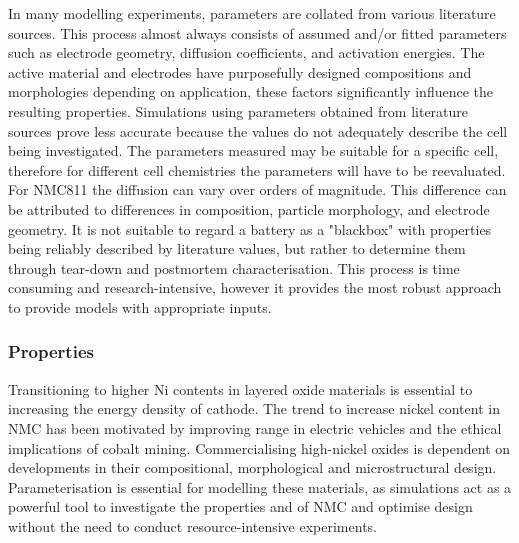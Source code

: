 \documentclass[aps,prb,twocolumn,superscriptaddress,reprint]{revtex4-1}
\begin{document}
In many modelling experiments, parameters are collated from various literature sources.\cite{Kim2011} This process almost always consists of assumed and/or fitted parameters such as electrode geometry, diffusion coefficients, and activation energies.\cite{Merla2018} The active material and electrodes have purposefully designed compositions and morphologies depending on application, these factors significantly influence the resulting properties.\cite{Lain2019} Simulations using parameters obtained from literature sources prove less accurate because the values do not adequately describe the cell being investigated.\cite{Zhang2014} The parameters measured may be suitable for a specific cell, therefore for different cell chemistries the parameters will have to be reevaluated. For NMC811 the diffusion can vary over orders of magnitude.\cite{Kim2011,noh2013comparison} This difference can be attributed to differences in composition, particle morphology, and electrode geometry.\cite{Liu2008,Luo_2015,Michaelis_2019_understanding} It is not suitable to regard a battery as a "blackbox" with properties being reliably described by literature values, but rather to determine them through tear-down and postmortem characterisation. This process is time consuming and research-intensive, however it provides the most robust approach to provide models with appropriate inputs. 

\subsubsection{Properties}
Transitioning to higher Ni contents in layered oxide materials is essential to increasing the energy density of cathode.\cite{Li_Erickson_Manthiram_2020, Manthiram_2020} The trend to increase nickel content in NMC has been motivated by improving range in electric vehicles and the ethical implications of cobalt mining. \cite{Nkulu2018,Banza2009} Commercialising high-nickel oxides is dependent on developments in their compositional, morphological and microstructural design. Parameterisation is essential for modelling these materials, as simulations act as a powerful tool to investigate the properties and of NMC and optimise design without the need to conduct resource-intensive experiments.\cite{shearing_2020_3D} 
\end{document}
